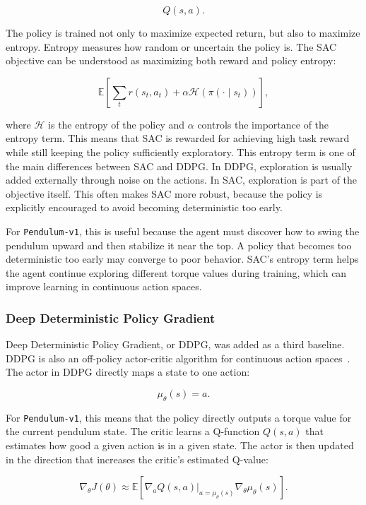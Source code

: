 \documentclass[11pt,a4paper]{article}
\begin{document}
\[
Q(s,a).
\]

The policy is trained not only to maximize expected return, but also to maximize entropy. Entropy measures how random or uncertain the policy is. The SAC objective can be understood as maximizing both reward and policy entropy:

\[
\mathbb{E}
\left[
\sum_t r(s_t,a_t) + \alpha \mathcal{H}(\pi(\cdot \mid s_t))
\right],
\]

where $\mathcal{H}$ is the entropy of the policy and $\alpha$ controls the importance of the entropy term. This means that SAC is rewarded for achieving high task reward while still keeping the policy sufficiently exploratory.
This entropy term is one of the main differences between SAC and DDPG. In DDPG, exploration is usually added externally through noise on the actions. In SAC, exploration is part of the objective itself. This often makes SAC more robust, because the policy is explicitly encouraged to avoid becoming deterministic too early.

For \texttt{Pendulum-v1}, this is useful because the agent must discover how to swing the pendulum upward and then stabilize it near the top. A policy that becomes too deterministic too early may converge to poor behavior. SAC's entropy term helps the agent continue exploring different torque values during training, which can improve learning in continuous action spaces.

\subsubsection{Deep Deterministic Policy Gradient}

Deep Deterministic Policy Gradient, or DDPG, was added as a third baseline. DDPG is also an off-policy actor-critic algorithm for continuous action spaces~\cite{lillicrap2015ddpg,spinningupddpg}.
The actor in DDPG directly maps a state to one action:

\[
\mu_{\theta}(s) = a.
\]

For \texttt{Pendulum-v1}, this means that the policy directly outputs a torque value for the current pendulum state. The critic learns a Q-function $Q(s,a)$ that estimates how good a given action is in a given state. The actor is then updated in the direction that increases the critic's estimated Q-value:

\[
\nabla_{\theta} J(\theta)
\approx
\mathbb{E}
\left[
\nabla_a Q(s,a)\vert_{a=\mu_{\theta}(s)}
\nabla_{\theta}\mu_{\theta}(s)
\right].
\]
\end{document}
